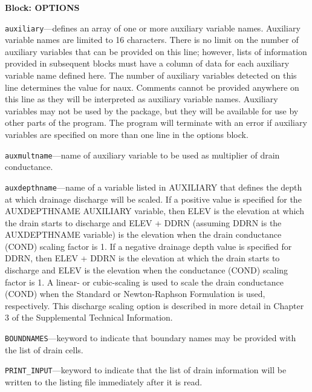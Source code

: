 
\item \textbf{Block: OPTIONS}

\begin{description}
\item \texttt{auxiliary}---defines an array of one or more auxiliary variable names.  Auxiliary variable names are limited to 16 characters.  There is no limit on the number of auxiliary variables that can be provided on this line; however, lists of information provided in subsequent blocks must have a column of data for each auxiliary variable name defined here.  The number of auxiliary variables detected on this line determines the value for naux.  Comments cannot be provided anywhere on this line as they will be interpreted as auxiliary variable names.  Auxiliary variables may not be used by the package, but they will be available for use by other parts of the program.  The program will terminate with an error if auxiliary variables are specified on more than one line in the options block.

\item \texttt{auxmultname}---name of auxiliary variable to be used as multiplier of drain conductance.

\item \texttt{auxdepthname}---name of a variable listed in AUXILIARY that defines the depth at which drainage discharge will be scaled. If a positive value is specified for the AUXDEPTHNAME AUXILIARY variable, then ELEV is the elevation at which the drain starts to discharge and ELEV + DDRN (assuming DDRN is the AUXDEPTHNAME variable) is the elevation when the drain conductance (COND) scaling factor is 1. If a negative drainage depth value is specified for DDRN, then ELEV + DDRN is the elevation at which the drain starts to discharge and ELEV is the elevation when the conductance (COND) scaling factor is 1. A linear- or cubic-scaling is used to scale the drain conductance (COND) when the Standard or Newton-Raphson Formulation is used, respectively.  This discharge scaling option is described in more detail in Chapter 3 of the Supplemental Technical Information.

\item \texttt{BOUNDNAMES}---keyword to indicate that boundary names may be provided with the list of drain cells.

\item \texttt{PRINT\_INPUT}---keyword to indicate that the list of drain information will be written to the listing file immediately after it is read.


\end{description}
